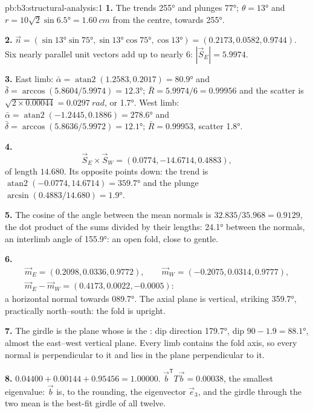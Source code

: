 \begin{solution}{pb:b3:structural-analysis:1}
\textbf{1.} The  trends \ang{255} and plunges \ang{77}; $\theta =
\ang{13}$ and $r = 10\sqrt2\sin\ang{6.5} = \qty{1.60}{cm}$ from the centre,
towards \ang{255}.

\textbf{2.} $\vec n = (\sin\ang{13}\sin\ang{75}, \sin\ang{13}\cos\ang{75},
\cos\ang{13}) = (0.2173, 0.0582, 0.9744)$. Six nearly parallel unit vectors
add up to nearly 6: $|\vec S_E| = 5.9974$.

\textbf{3.} East limb: $\bar\alpha = \operatorname{atan2}(1.2583, 0.2017) =
\ang{80.9}$ and $\bar\delta = \arccos(5.8604/5.9974) = \ang{12.3}$; $\bar R
= 5.9974/6 = 0.99956$ and the scatter is $\sqrt{2\times0.00044} =
\qty{0.0297}{rad}$, or \ang{1.7}. West limb: $\bar\alpha =
\operatorname{atan2}(-1.2445, 0.1886) = \ang{278.6}$ and $\bar\delta =
\arccos(5.8636/5.9972) = \ang{12.1}$; $\bar R = 0.99953$, scatter \ang{1.8}.

\textbf{4.}
\[
  \vec S_E\times\vec S_W = (0.0774, -14.6714, 0.4883),
\]
of length $14.680$. Its opposite points down: the trend is $\operatorname{atan2}(-0.0774, 14.6714) = \ang{359.7}$ and the
plunge $\arcsin(0.4883/14.680) = \ang{1.9}$.

\textbf{5.} The cosine of the angle between the mean normals is
$32.835/35.968 = 0.9129$, the dot product of the sums divided by their
lengths: \ang{24.1} between the normals, an interlimb angle of \ang{155.9}:
an open fold, close to gentle.

\textbf{6.}
\begin{gather*}
  \vec m_E = (0.2098, 0.0336, 0.9772),\qquad \vec m_W = (-0.2075, 0.0314, 0.9777),\\
  \vec m_E - \vec m_W = (0.4173, 0.0022, -0.0005):
\end{gather*}
a horizontal normal towards \ang{089.7}. The axial plane is vertical, striking
\ang{359.7}, practically north--south: the fold is upright.

\textbf{7.} The girdle is the plane whose  is the : dip direction
\ang{179.7}, dip $90 - 1.9 = \ang{88.1}$, almost the east--west vertical
plane. Every limb contains the fold axis, so every normal is perpendicular to
it and lies in the plane perpendicular to it.

\textbf{8.} $0.04400 + 0.00144 + 0.95456 = 1.00000$. $\vec b^{\mathsf T}T\vec
b = 0.00038$, the smallest eigenvalue: $\vec b$ is, to the rounding, the
eigenvector $\vec e_3$, and the girdle through the two mean  is the
best-fit girdle of all twelve.


\end{solution}
